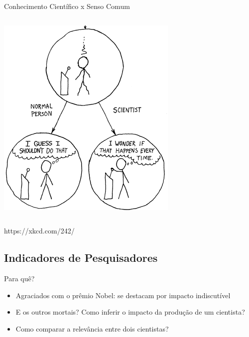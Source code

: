 \documentclass{beamer}
\begin{document}
\begin{frame}{Conhecimento Científico x Senso Comum}
\begin{columns}
\begin{column}{5cm}
\begin{center}
\begin{center}
          \includegraphics[width=\textwidth]{Intro/the_difference2}
        \end{center}
      \end{center}
    \end{column}
  \end{columns}

https://xkcd.com/242/
\end{frame}

\subsection{Indicadores de Pesquisadores}

\begin{frame}{Para quê?}
  \begin{itemize}
  \item Agraciados com o prêmio Nobel: se destacam por impacto indiscutível
  \item E os outros mortais? Como inferir o impacto da produção de um cientista?
  \item Como comparar a relevância entre dois cientistas?
  \end{itemize}
\end{frame}
\end{document}
